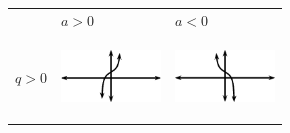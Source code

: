 \begin{center}
\label{m39414*uid86}
\noindent
{}
\tablelasttail{}
\begin{xtabular*}{\mytablewidth}[t]{|p{10\mystarwidth}|p{10\mystarwidth}|p{10\mystarwidth}|}\hline
&
    $a>0$
    &
    $a<0$
\tabularnewline{}
    $q>0$
    &
\setcounter{subfigure}{0}
\label{m39414*id90981}
\begin{center}
\label{m39414*id90981!!!underscore!!!media}\label{m39414*id90981!!!underscore!!!printimage}\includegraphics[width=100px]{col11306.imgs/m39414_MG10C15_034.png} %
\vspace{2pt}
\vspace{.1in}
\end{center}    
    &
\setcounter{subfigure}{0}
\label{m39414*id90993}
\begin{center}
\label{m39414*id90993!!!underscore!!!media}\label{m39414*id90993!!!underscore!!!printimage}\includegraphics[width=100px]{col11306.imgs/m39414_MG10C15_035.png} %

\end{center}
\end{xtabular*}
\end{center}
